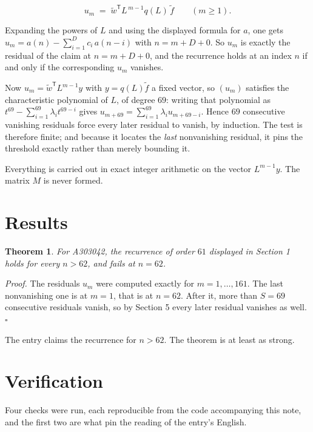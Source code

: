 \documentclass[11pt]{article}
\newtheorem{theorem}{Theorem}
\theoremstyle{definition}
\begin{document}
\[u_m \;=\; \tilde w^{\mathsf T} L^{\,m-1} q(L)\,\tilde f \qquad (m \ge 1).\]

Expanding the powers of $L$ and using the displayed formula for $a$, one gets $u_m = a(n) - \sum_{i=1}^{D} c_i\,a(n-i)$ with $n = m + D + 0$. So $u_m$ is exactly the residual of the claim at $n = m + D + 0$, and the recurrence holds at an index $n$ if and only if the corresponding $u_m$ vanishes.

Now $u_m = \tilde w^{\mathsf T} L^{m-1} y$ with $y = q(L)\tilde f$ a fixed vector, so $(u_m)$ satisfies the characteristic polynomial of $L$, of degree $69$: writing that polynomial as $t^{69} - \sum_{i=1}^{69} \lambda_i t^{69-i}$ gives $u_{m+69} = \sum_{i=1}^{69} \lambda_i u_{m+69-i}$. Hence $69$ consecutive vanishing residuals force every later residual to vanish, by induction. The test is therefore finite; and because it locates the {\itshape last} nonvanishing residual, it pins the threshold exactly rather than merely bounding it.

Everything is carried out in exact integer arithmetic on the vector $L^{m-1}y$. The matrix $M$ is never formed.

\section{Results}

\begin{theorem} For A303042, the recurrence of order $61$ displayed in Section 1 holds for every $n > 62$, and fails at $n = 62$.\end{theorem}

{\itshape Proof.} The residuals $u_m$ were computed exactly for $m = 1,\dots,161$. The last nonvanishing one is at $m = 1$, that is at $n = 62$. After it, more than $S = 69$ consecutive residuals vanish, so by Section 5 every later residual vanishes as well. $\square$

The entry claims the recurrence for $n > 62$. The theorem is at least as strong.

\section{Verification}

Four checks were run, each reproducible from the code accompanying this note, and the first two are what pin the reading of the entry's English.
\end{document}
